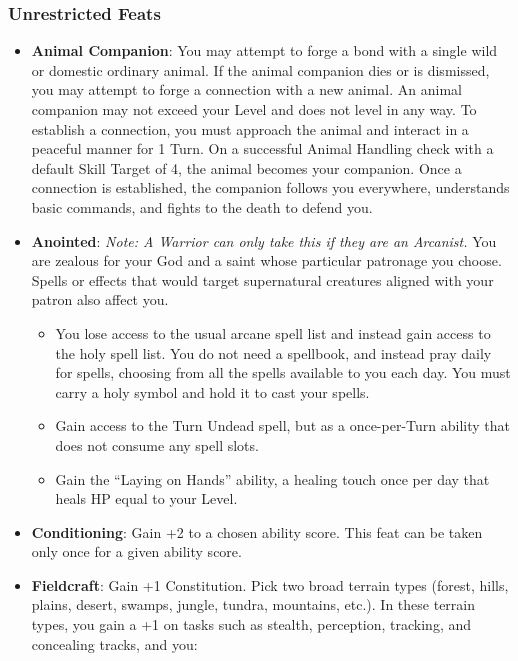 \documentclass{book}
\providecommand{\tightlist}{%
\setlength{\itemsep}{0pt}\setlength{\parskip}{0pt}}
\begin{document}
\subsubsection*{Unrestricted Feats}\label{unrestricted-feats}

\begin{itemize}
\tightlist
\item
  \textbf{Animal Companion}: You may attempt to forge a bond with a
  single wild or domestic ordinary animal. If the animal companion dies
  or is dismissed, you may attempt to forge a connection with a new
  animal. An animal companion may not exceed your Level and does not
  level in any way. To establish a connection, you must approach the
  animal and interact in a peaceful manner for 1 Turn. On a successful
  Animal Handling check with a default Skill Target of 4, the animal
  becomes your companion. Once a connection is established, the
  companion follows you everywhere, understands basic commands, and
  fights to the death to defend you.
\item
  \textbf{Anointed}: \emph{Note: A Warrior can only take this if they
  are an Arcanist.} You are zealous for your God and a saint whose
  particular patronage you choose. Spells or effects that would target
  supernatural creatures aligned with your patron also affect you.

  \begin{itemize}
  \tightlist
  \item
    You lose access to the usual arcane spell list and instead gain
    access to the holy spell list. You do not need a spellbook, and
    instead pray daily for spells, choosing from all the spells
    available to you each day. You must carry a holy symbol and hold it
    to cast your spells.
  \item
    Gain access to the Turn Undead spell, but as a once-per-Turn ability
    that does not consume any spell slots.
  \item
    Gain the ``Laying on Hands'' ability, a healing touch once per day
    that heals HP equal to your Level.
  \end{itemize}
\item
  \textbf{Conditioning}: Gain +2 to a chosen ability score. This feat
  can be taken only once for a given ability score.
\item
  \textbf{Fieldcraft}: Gain +1 Constitution. Pick two broad terrain
  types (forest, hills, plains, desert, swamps, jungle, tundra,
  mountains, etc.). In these terrain types, you gain a +1 on tasks such
  as stealth, perception, tracking, and concealing tracks, and you:


\end{itemize}
\end{document}
